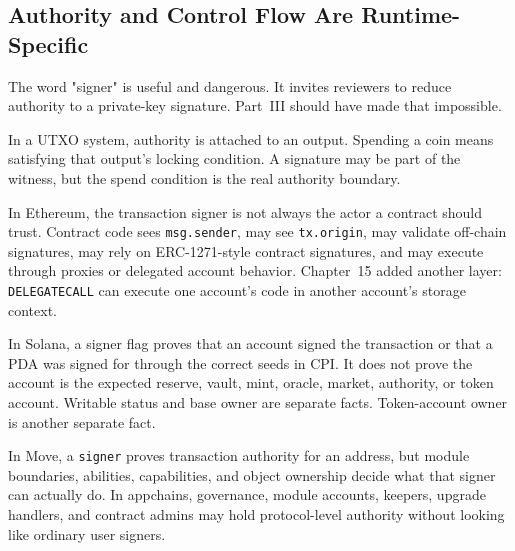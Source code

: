 \subsection{Authority and Control Flow Are Runtime-Specific}

The word "signer" is useful and dangerous. It invites reviewers to reduce authority to a private-key signature. Part~III should have made that impossible.

In a UTXO system, authority is attached to an output. Spending a coin means satisfying that output's locking condition. A signature may be part of the witness, but the spend condition is the real authority boundary.

In Ethereum, the transaction signer is not always the actor a contract should trust. Contract code sees \texttt{msg.sender}, may see \texttt{tx.origin}, may validate off-chain signatures, may rely on ERC-1271-style contract signatures, and may execute through proxies or delegated account behavior. Chapter~15 added another layer: \texttt{DELEGATECALL} can execute one account's code in another account's storage context.

In Solana, a signer flag proves that an account signed the transaction or that a PDA was signed for through the correct seeds in CPI. It does not prove the account is the expected reserve, vault, mint, oracle, market, authority, or token account. Writable status and base owner are separate facts. Token-account owner is another separate fact.

In Move, a \texttt{signer} proves transaction authority for an address, but module boundaries, abilities, capabilities, and object ownership decide what that signer can actually do. In appchains, governance, module accounts, keepers, upgrade handlers, and contract admins may hold protocol-level authority without looking like ordinary user signers.

